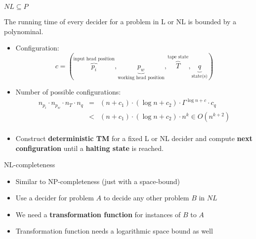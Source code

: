 \begin{frame}{$NL \subseteq P$}

\begin{theorem}
The running time of every decider for a problem in L or NL is bounded by a polynominal.
\end{theorem}

\begin{itemize}
\item Configuration:
    \[
        c = (\overbrace{p_i}^{\text{input head position}}, \underbrace{p_w}_{\text{working head position}}, \overbrace{T}^{\text{tape state}}, \underbrace{q}_{\text{state(s)}})
    \]
\item Number of possible configurations:
$$
\begin{array}{rcl}
n_{p_i} \cdot n_{p_w} \cdot n_T \cdot n_q & = & (n + c_1) \cdot (\log n + c_2) \cdot \Gamma^{\log n + c} \cdot c_q \\
                                          & < & (n + c_1) \cdot (\log n + c_2) \cdot n^k \in O(n^{k+2}) \\
\end{array}
$$
\item Construct \textbf{deterministic TM} for a fixed L or NL decider and compute \textbf{next configuration} until
        a \textbf{halting state} is reached.
\end{itemize}

\end{frame}

\begin{frame}{NL-completeness}

\begin{itemize}
\item
  Similar to NP-completeness (just with a space-bound)
\item
  Use a decider for problem $A$ to decide any other problem $B$ in $NL$
\item
  We need a \textbf{transformation function} for instances of $B$ to $A$
\item
  Transformation function needs a logarithmic space bound as well
\end{itemize}

\end{frame}

